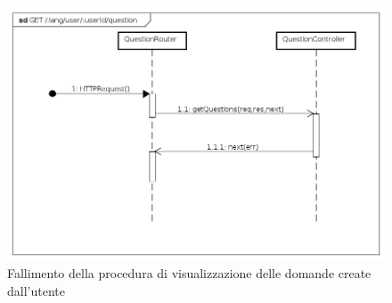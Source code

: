 \begin{itemize}
\begin{figure}[ht]
	\centering
	\includegraphics[scale=0.45]{UML/DiagrammiDiSequenza/Back-end/GET__lang_user__userId_question_failure.png}
	\caption{Fallimento della procedura di visualizzazione delle domande create dall'utente}
\end{figure}
\FloatBarrier

\end{itemize}


